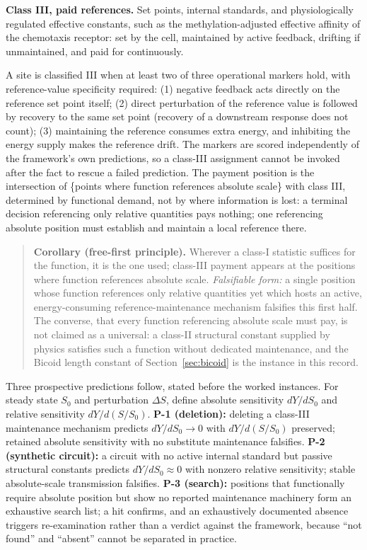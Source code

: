 \documentclass[11pt,a4paper]{article}
\begin{document}
\textbf{Class III, paid references.} Set points, internal standards, and physiologically regulated effective constants, such as the methylation-adjusted effective affinity of the chemotaxis receptor: set by the cell, maintained by active feedback, drifting if unmaintained, and paid for continuously.

A site is classified III when at least two of three operational markers hold, with reference-value specificity required: (1) negative feedback acts directly on the reference set point itself; (2) direct perturbation of the reference value is followed by recovery to the same set point (recovery of a downstream response does not count); (3) maintaining the reference consumes extra energy, and inhibiting the energy supply makes the reference drift. The markers are scored independently of the framework's own predictions, so a class-III assignment cannot be invoked after the fact to rescue a failed prediction. The payment position is the intersection of \{points where function references absolute scale\} with class III, determined by functional demand, not by where information is lost: a terminal decision referencing only relative quantities pays nothing; one referencing absolute position must establish and maintain a local reference there.

\begin{quote}
\textbf{Corollary (free-first principle).} Wherever a class-I statistic suffices for the function, it is the one used; class-III payment appears at the positions where function references absolute scale. \emph{Falsifiable form:} a single position whose function references only relative quantities yet which hosts an active, energy-consuming reference-maintenance mechanism falsifies this first half. The converse, that every function referencing absolute scale must pay, is not claimed as a universal: a class-II structural constant supplied by physics satisfies such a function without dedicated maintenance, and the Bicoid length constant of Section~\ref{sec:bicoid} is the instance in this record.
\end{quote}

Three prospective predictions follow, stated before the worked instances. For steady state $S_0$ and perturbation $\Delta S$, define absolute sensitivity $dY/dS_0$ and relative sensitivity $dY/d(S/S_0)$. \textbf{P-1 (deletion):} deleting a class-III maintenance mechanism predicts $dY/dS_0\to0$ with $dY/d(S/S_0)$ preserved; retained absolute sensitivity with no substitute maintenance falsifies. \textbf{P-2 (synthetic circuit):} a circuit with no active internal standard but passive structural constants predicts $dY/dS_0\approx0$ with nonzero relative sensitivity; stable absolute-scale transmission falsifies. \textbf{P-3 (search):} positions that functionally require absolute position but show no reported maintenance machinery form an exhaustive search list; a hit confirms, and an exhaustively documented absence triggers re-examination rather than a verdict against the framework, because ``not found'' and ``absent'' cannot be separated in practice.
\end{document}
